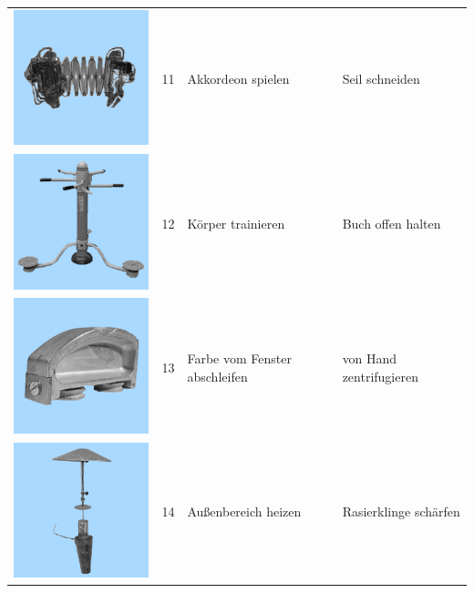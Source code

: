 \documentclass[
  english,
  doc,12pt,twoside,floatsintext]{apa7}
\begin{document}
\begin{center}
\begin{ThreePartTable}
\begin{longtable}{llll}
\includegraphics[valign=c, scale=0.19]{../materials/unfamiliar/11.png} & 11 & Akkordeon spielen & Seil schneiden\\
\includegraphics[valign=c, scale=0.19]{../materials/unfamiliar/12.png} & 12 & Körper trainieren & Buch offen halten\\
\includegraphics[valign=c, scale=0.19]{../materials/unfamiliar/13.png} & 13 & Farbe vom Fenster abschleifen & von Hand zentrifugieren\\
\includegraphics[valign=c, scale=0.19]{../materials/unfamiliar/14.png} & 14 & Außenbereich heizen & Rasierklinge schärfen\\

\end{longtable}
\end{ThreePartTable}
\end{center}
\end{document}
